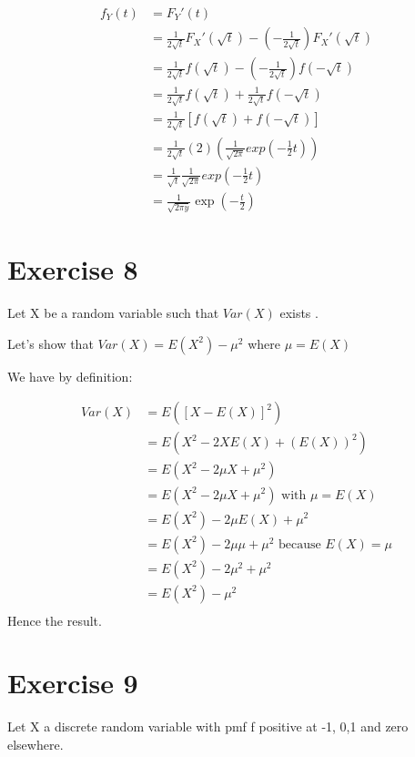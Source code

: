 \documentclass[11pt]{article}
\begin{document}
\begin{align*}
    f_Y(t) &= F_Y'(t) \\
           &= \frac{1}{2\sqrt{t}}F_X'(\sqrt{t})-(-\frac{1}{2\sqrt{t}})F_X'(\sqrt{t}) \\
          &= \frac{1}{2\sqrt{t}}f(\sqrt{t})-(-\frac{1}{2\sqrt{t}})f(-\sqrt{t}) \\                                          
          &= \frac{1}{2\sqrt{t}}f(\sqrt{t})+\frac{1}{2\sqrt{t}}f(-\sqrt{t}) \\                                          
          &= \frac{1}{2\sqrt{t}}[f(\sqrt{t})+f(-\sqrt{t})] \\
          &= \frac{1}{2\sqrt{t}}(2)(\frac{1}{\sqrt{2\pi}} exp(-\frac{1}{2}t )) \\          
           &= \frac{1}{\sqrt{t}}\frac{1}{\sqrt{2\pi}} exp(-\frac{1}{2}t ) \\ 
           &=\frac{1}{\sqrt{2\pi y}}\exp(-\frac{t}{2})         
\end{align*}

     
\newpage 
    \section{Exercise 8}
Let X be a random variable such that $Var(X)$ exists .


Let's show that 
$Var(X)=E(X^2)-\mu^2$  where $\mu=E(X)$ 

We have by definition:

\begin{align*}
    Var(X) &= E([X-E(X)]^2) \\
           &= E(X^2-2XE(X)+(E(X))^2) \\
           &= E(X^2-2\mu X+\mu^2) \\
           &= E(X^2-2\mu X+\mu^2)\text{ with } \mu=E(X) \\           
           &=  E(X^2)-2\mu E(X)+\mu^2\\      
           &=  E(X^2)-2\mu\mu+\mu^2\text{ because } E(X)=\mu \\  
           &=  E(X^2)-2\mu^2+\mu^2 \\
           &=  E(X^2)-\mu^2 \\                                    
\end{align*}
Hence the result.



\newpage 
    \section{Exercise 9}
    Let X a discrete random variable with pmf f positive at -1, 0,1 and zero elsewhere.
\end{document}
